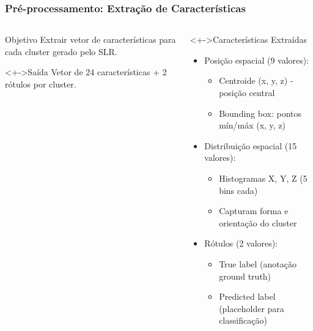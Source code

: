 \documentclass[aspectratio=169,t,xcolor=table]{beamer}
\begin{document}
\begin{frame}
    \frametitle{Pré-processamento: Extração de Características}
    \begin{columns}[T]
        \begin{column}{.4\textwidth}
            \begin{block}{Objetivo}
                \vspace{0.5em}
                Extrair vetor de características para cada cluster gerado pelo SLR.
                \vspace{0.5em}
            \end{block}
            \begin{block}<+->{Saída}
                \vspace{0.5em}
                Vetor de 24 características + 2 rótulos por cluster.
                \vspace{0.5em}
            \end{block}
        \end{column}
        \begin{column}{.6\textwidth}
            \begin{block}<+->{Características Extraídas}
                \begin{itemize}[<+->]
                    \item Posição espacial (9 valores):
                          \begin{itemize}
                              \item Centroide (x, y, z) - posição central
                              \item Bounding box: pontos mín/máx (x, y, z)
                          \end{itemize}
                    \item Distribuição espacial (15 valores):
                          \begin{itemize}
                              \item Histogramas X, Y, Z (5 bins cada)
                              \item Capturam forma e orientação do cluster
                          \end{itemize}
                    \item Rótulos (2 valores):
                          \begin{itemize}
                              \item True label (anotação ground truth)
                              \item Predicted label (placeholder para classificação)
                          \end{itemize}
                \end{itemize}
            \end{block}
        \end{column}
    \end{columns}
\end{frame}
\end{document}
